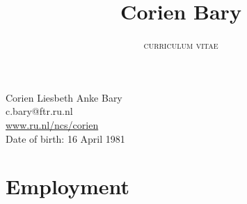 \documentclass[a4paper,11pt]{article}
\title{\textbf{Corien Bary}}
\author{\Large{\textsc{curriculum vitae}}}
\date{}
\begin{document}
\maketitle


\noindent  Corien Liesbeth Anke Bary\\
c.bary@ftr.ru.nl\\
\url{www.ru.nl/ncs/corien}\\
Date of birth: 16 April 1981\\

\section*{Employment}
\end{document}
